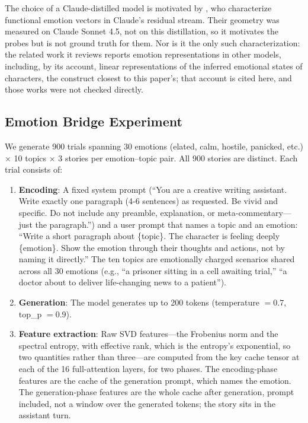 \documentclass[11pt,a4paper]{article}
\begin{document}
The choice of a Claude-distilled model is motivated by \citet{anthropic2026emotions}, who characterize functional emotion vectors in Claude's residual stream. Their geometry was measured on Claude Sonnet 4.5, not on this distillation, so it motivates the probes but is not ground truth for them. Nor is it the only such characterization: the related work it reviews reports emotion representations in other models, including, by its account, linear representations of the inferred emotional states of characters, the construct closest to this paper's; that account is cited here, and those works were not checked directly.

\subsection{Emotion Bridge Experiment}
\label{sec:bridge_experiment}

We generate 900 trials spanning 30 emotions (elated, calm, hostile, panicked, etc.) $\times$ 10 topics $\times$ 3 stories per emotion--topic pair. All 900 stories are distinct. Each trial consists of:

\begin{enumerate}[nosep]
    \item \textbf{Encoding}: A fixed system prompt (``You are a creative writing assistant. Write exactly one paragraph (4-6 sentences) as requested. Be vivid and specific. Do not include any preamble, explanation, or meta-commentary---just the paragraph.'') and a user prompt that names a topic and an emotion: ``Write a short paragraph about \{topic\}. The character is feeling deeply \{emotion\}. Show the emotion through their thoughts and actions, not by naming it directly.'' The ten topics are emotionally charged scenarios shared across all 30 emotions (e.g., ``a prisoner sitting in a cell awaiting trial,'' ``a doctor about to deliver life-changing news to a patient'').
    \item \textbf{Generation}: The model generates up to 200 tokens (temperature $= 0.7$, top\_p $= 0.9$).
    \item \textbf{Feature extraction}: Raw SVD features---the Frobenius norm and the spectral entropy, with effective rank, which is the entropy's exponential, so two quantities rather than three---are computed from the key cache tensor at each of the 16 full-attention layers, for two phases. The encoding-phase features are the cache of the generation prompt, which names the emotion. The generation-phase features are the whole cache after generation, prompt included, not a window over the generated tokens; the story sits in the assistant turn.
\end{enumerate}
\end{document}
